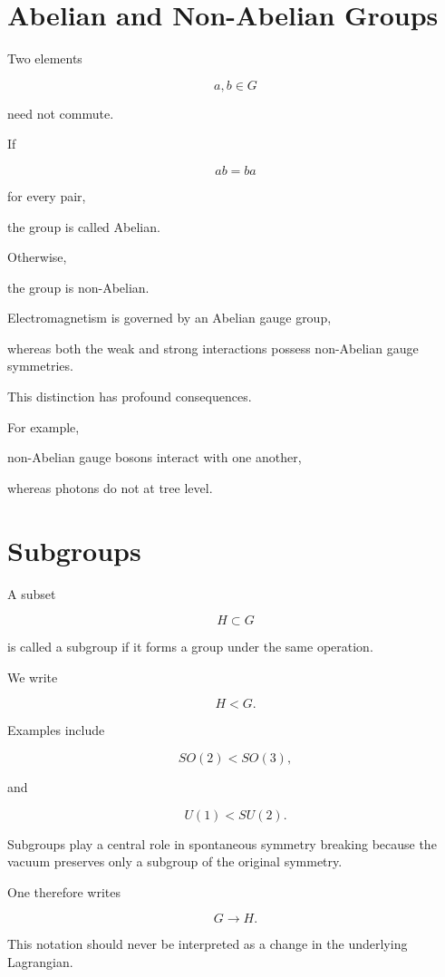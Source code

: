 
\section{Abelian and Non-Abelian Groups}

Two elements

\[
a,b\in G
\]

need not commute.

If

\[
ab
=
ba
\]

for every pair,

the group is called Abelian.

Otherwise,

the group is non-Abelian.

Electromagnetism is governed by an Abelian gauge group,

whereas both the weak and strong interactions possess non-Abelian gauge
symmetries.

This distinction has profound consequences.

For example,

non-Abelian gauge bosons interact with one another,

whereas photons do not at tree level.


\section{Subgroups}

A subset

\[
H
\subset
G
\]

is called a subgroup if it forms a group under the same operation.

We write

\[
H<G.
\]

Examples include

\[
SO(2)
<
SO(3),
\]

and

\[
U(1)
<
SU(2).
\]

Subgroups play a central role in spontaneous symmetry breaking because
the vacuum preserves only a subgroup of the original symmetry.

One therefore writes

\[
G
\rightarrow
H.
\]

This notation should never be interpreted as a change in the underlying
Lagrangian.

